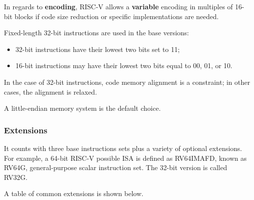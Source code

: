 \documentclass[a4paper,11pt]{article}
\begin{document}
In regards to \textbf{encoding}, RISC-V allows a \textbf{variable} encoding in multiples of 16-bit blocks if code size reduction or specific implementations are needed.

Fixed-length 32-bit instructions are used in the base versions:
\begin{itemize}
	\item 32-bit instructions have their lowest two bits set to 11;
	\item 16-bit instructions may have their lowest two bits equal to 00, 01, or 10.
\end{itemize}

In the case of 32-bit instructions, code memory alignment is a constraint; in other cases, the alignment is relaxed.

A little-endian memory system is the default choice.

\subsubsection{Extensions}

It counts with three base instructions sets plus a variety of optional extensions.
For example, a 64-bit RISC-V possible ISA is defined as RV64IMAFD, known as RV64G, general-purpose scalar instruction set.
The 32-bit version is called RV32G.

A table of common extensions is shown below.

\renewcommand{\tablename}{Table}
\renewcommand{\figurename}{Figure}
\end{document}
